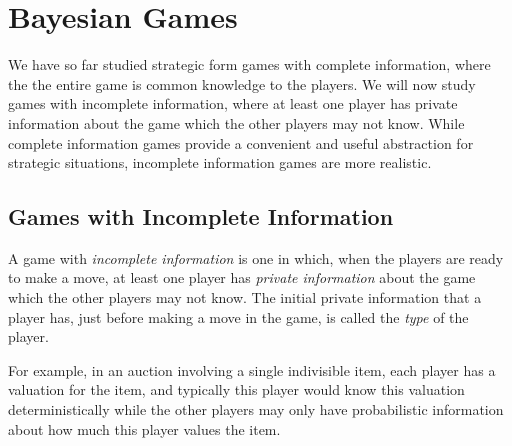 \section{Bayesian Games}
We have so far studied strategic form games with complete information, where the the entire game is common knowledge to the players.
We will now study games with incomplete information, where at least one player has private information about the game which the other players may not know.
While complete information games provide a convenient and useful abstraction for strategic situations, incomplete information games are more realistic.
\subsection{Games with Incomplete Information}
A game with \emph{incomplete information} is one in which, when the players are ready to make a move, at least one player has \emph{private information} about the game which the other players may not know.
The initial private information that a player has, just before making a move in the game, is called the \emph{type} of the player.

For example, in an auction involving a single indivisible item, each player has a valuation for the item, and typically this player would know this valuation deterministically while the other players may only have probabilistic information about how much this player values the item.
